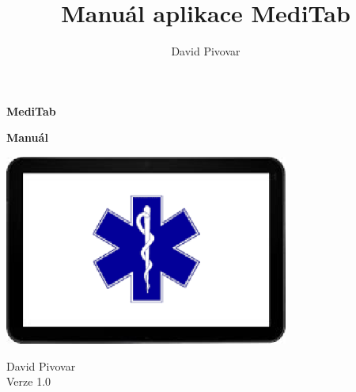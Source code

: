 \documentclass[12pt, a4paper]{report}
\title{Manuál aplikace MediTab}
\author{David Pivovar}
\begin{document}
\begin{titlepage}

\begin{center}

\vspace*{50pt}
	
	{\fontsize{36}{0} \textbf{
		{\color{red}MediTab}
	}}
	
	\vfill
	
	{\fontsize{28}{0} \textbf{
		Manuál
	}}
	
	\vfill
	\vfill
	
	\includegraphics[width=0.7\textwidth]{img/logo_wide.eps}

\end{center}

\vspace{110pt}

\begin{flushleft}

	{\fontsize{20}{0} \selectfont
		David Pivovar\\[5pt]
		\hfill
		Verze 1.0
	}
	
\end{flushleft}

\end{titlepage}


\tableofcontents





\end{document}
